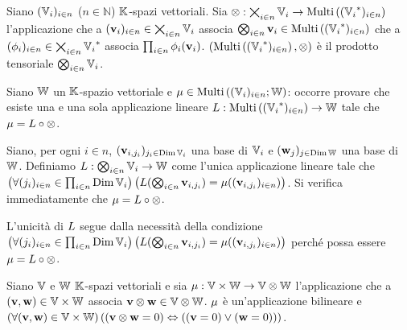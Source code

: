 \begin{Corollary}
	Siano $(\mathbb{V}_i)_{i \in n}$ ($n \in \mathbb{N}$) $\mathbb{K}$-spazi vettoriali.
	Sia $\otimes: \bigtimes_{i \in n} \mathbb{V}_i \rightarrow \text{Multi}\left ( ({{\mathbb{V}_i}^*})_{i \in n} \right )$ l'applicazione che a $(\mathbf{v}_i)_{i \in n} \in \bigtimes_{i \in n} \mathbb{V}_i$ associa $\bigotimes_{i \in n} \mathbf{v}_i \in \text{Multi}\left ( ({{\mathbb{V}_i}^*})_{i \in n} \right )$ che a $(\phi_i)_{i \in n} \in \bigtimes_{i \in n} {{\mathbb{V}_i}^*}$ associa $\prod_{i \in n} \phi_i(\mathbf{v}_i)$.
	$(\text{Multi}\left ( ({{\mathbb{V}_i}^*})_{i \in n} \right ), \otimes)$ \`e il prodotto tensoriale $\bigotimes_{i \in n} \mathbb{V}_i$.
\end{Corollary}
\Proof Siano $\mathbb{W}$ un $\mathbb{K}$-spazio vettoriale e $\mu \in \text{Multi}\left ( (\mathbb{V}_i)_{i \in n} ; \mathbb{W} \right )$: occorre provare che esiste una e una sola applicazione lineare $L: \text{Multi}\left ( ({{\mathbb{V}_i}^*})_{i \in n} \right ) \rightarrow \mathbb{W}$ tale che $\mu = L \circ \otimes$.
\par Siano, per ogni $i \in n$, $(\mathbf{v}_{i,j_i})_{j_i \in \operatorname{\operatorname{Dim}}{\mathbb{V}_i}}$ una base di $\mathbb{V}_i$ e $(\mathbf{w}_j)_{j \in \operatorname{\operatorname{Dim}}{\mathbb{W}}}$ una base di $\mathbb{W}$. Definiamo $L: \bigotimes_{i \in n} \mathbb{V}_i \rightarrow \mathbb{W}$ come l'unica applicazione lineare tale che $\left ( \forall (j_i)_{i \in n} \in \prod_{i \in n} \operatorname{\operatorname{Dim}}{\mathbb{V}_i} \right ) \left ( L(\bigotimes_{i \in n} \mathbf{v}_{i,j_i}) = \mu((\mathbf{v}_{i,j_i})_{i \in n}) \right )$. Si verifica immediatamente che $\mu = L \circ \otimes$.
\par L'unicit\`a di $L$ segue dalla necessit\`a della condizione $\left ( \forall (j_i)_{i \in n} \in \prod_{i \in n} \operatorname{\operatorname{Dim}}{\mathbb{V}_i} \right ) \left ( L(\bigotimes_{i \in n} \mathbf{v}_{i,j_i}) = \mu((\mathbf{v}_{i,j_i})_{i \in n}) \right )$ perch\'e possa essere $\mu = L \circ \otimes$. \EndProof
\begin{Theorem}
	Siano $\mathbb{V}$ e $\mathbb{W}$ $\mathbb{K}$-spazi vettoriali e sia $\mu: \mathbb{V} \times \mathbb{W} \rightarrow \mathbb{V} \otimes \mathbb{W}$ l'applicazione che a $(\mathbf{v},\mathbf{w}) \in \mathbb{V} \times \mathbb{W}$ associa $\mathbf{v} \otimes \mathbf{w} \in \mathbb{V} \otimes \mathbb{W}$. $\mu$ \`e un'applicazione bilineare e $\left ( \forall (\mathbf{v},\mathbf{w}) \in \mathbb{V} \times \mathbb{W} \right ) \left ( \left ( \mathbf{v} \otimes \mathbf{w} = 0 \right ) \Leftrightarrow \left ( \left ( \mathbf{v} = 0 \right ) \vee \left ( \mathbf{w} = 0 \right ) \right ) \right )$.
\end{Theorem}
